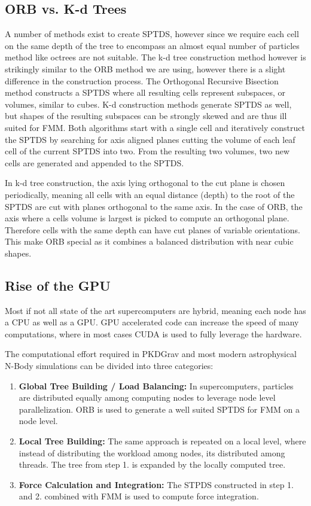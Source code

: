 \documentclass[]{article}
\begin{document}
\subsection{ORB vs. K-d Trees}

A number of methods exist to create SPTDS, however since we require each cell on the same depth of the tree to encompass an almost equal number of particles method like octrees are not suitable. The k-d tree construction method however is strikingly similar to the ORB method we are using, however there is a slight difference in the construction process. 
The Orthogonal Recursive Bisection method constructs a SPTDS where all resulting cells represent subspaces, or volumes, similar to cubes. K-d construction methods generate SPTDS as well, but shapes of the resulting subspaces can be strongly skewed and are thus ill suited for FMM. Both algorithms start with a single cell and iteratively construct the SPTDS by searching for axis aligned planes cutting the volume of each leaf cell of the current SPTDS into two. From the resulting two volumes, two new cells are generated and appended to the SPTDS. 

In k-d tree construction, the axis lying orthogonal to the cut plane is chosen periodically, meaning all cells with an equal distance (depth) to the root of the SPTDS are cut with planes orthogonal to the same axis. In the case of ORB, the axis where a cells volume is largest is picked to compute an orthogonal plane. Therefore cells with the same depth can have cut planes of variable orientations. This make ORB special as it combines a balanced distribution with near cubic shapes.  

\subsection{Rise of the GPU}

Most if not all state of the art supercomputers are hybrid, meaning each node has a CPU as well as a GPU.\cite{TOP500} GPU accelerated code can increase the speed of many computations, where in most cases CUDA is used to fully leverage the hardware. 

The computational effort required in PKDGrav and most modern astrophysical N-Body simulations can be divided into three categories:

\begin{enumerate}
	\item \textbf{Global Tree Building / Load Balancing:} In supercomputers, particles are distributed equally among computing nodes to leverage node level parallelization. ORB is used to generate a well suited SPTDS for FMM on a node level.
	\item \textbf{Local Tree Building:} The same approach is repeated on a local level, where instead of distributing the workload among nodes, its distributed among threads. The tree from step 1. is expanded by the locally computed tree.
	\item \textbf{Force Calculation and Integration:} The STPDS constructed in step 1. and 2. combined with FMM is used to compute force integration. 
\end{enumerate}
\end{document}
